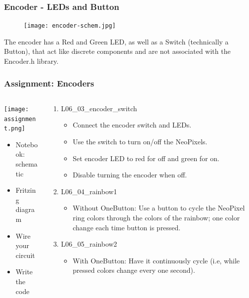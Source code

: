 \documentclass{beamer}
\begin{document}
\begin{frame}\frametitle{Encoder - LEDs and Button}
\begin{figure}[h]
	\texttt{[image: encoder-schem.jpg]}
\end{figure}
The encoder has a Red and Green LED, as well as a Switch (technically a Button), that act like discrete components and are not associated with the Encoder.h library. 
\end{frame}

\begin{frame}\frametitle{Assignment: Encoders}
\begin{columns}
\begin{column}{4cm}
\texttt{[image: assignment.png]}
\begin{itemize}
\item Notebook: schematic
\item Fritzing diagram
\item Wire your circuit
\item Write the code
\end{itemize}
\end{column}
\begin{column}{7.2cm}
\begin{enumerate}
\item L06\_03\_encoder\_switch
	\begin{itemize}
		\item Connect the encoder switch and LEDs.
		\item Use the switch to turn on/off the NeoPixels.
		\item Set encoder LED to red for off and green for on.
		\item Disable turning the encoder when off.
	\end{itemize}
\item L06\_04\_rainbow1
	\begin{itemize}
		\item Without OneButton: Use a button to cycle the NeoPixel ring colors through the colors of the rainbow; one color change each time button is pressed.
	\end{itemize}
\item L06\_05\_rainbow2
	\begin{itemize}
		\item With OneButton: Have it continuously cycle (i.e, while pressed colors change every one second).
	\end{itemize}
		
\end{enumerate}
\end{column}
\end{columns}
\end{frame}
\end{document}

